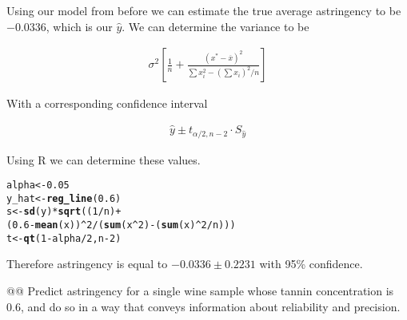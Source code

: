 \documentclass[10pt]{article}\usepackage[]{graphicx}\usepackage[]{xcolor}
\makeatletter
\newcommand{\hlnum}[1]{\textcolor[rgb]{0.686,0.059,0.569}{#1}}%
\newcommand{\hlopt}[1]{\textcolor[rgb]{0,0,0}{#1}}%
\newcommand{\hlstd}[1]{\textcolor[rgb]{0.345,0.345,0.345}{#1}}%
\newcommand{\hlkwb}[1]{\textcolor[rgb]{0.69,0.353,0.396}{#1}}%
\newcommand{\hlkwd}[1]{\textcolor[rgb]{0.737,0.353,0.396}{\textbf{#1}}}%
\newenvironment{kframe}{%
 \def\at@end@of@kframe{}%
 \ifinner\ifhmode%
  \def\at@end@of@kframe{\end{minipage}}%
  \begin{minipage}{\columnwidth}%
 \fi\fi%
 \def\FrameCommand##1{\hskip\@totalleftmargin \hskip-\fboxsep
 \colorbox{shadecolor}{##1}\hskip-\fboxsep
     \hskip-\linewidth \hskip-\@totalleftmargin \hskip\columnwidth}%
 \MakeFramed {\advance\hsize-\width
   \@totalleftmargin\z@ \linewidth\hsize
   \@setminipage}}%
 {\par\unskip\endMakeFramed%
 \at@end@of@kframe}
\newenvironment{knitrout}{}{} %
\makeatother
\begin{document}
\begin{easylist}[enumerate]
    Using our model from before we can estimate the true average astringency to be $-0.0336$, which is our
    $\hat{y}$. We can determine the variance to be

    \begin{equation}
        \begin{aligned}
            \sigma^2 \left[
                \frac{1}{n} + \frac{{\left( x^* - \overline{x} \right)}^2}
                                {\sum x_i^2 - \left( \sum x_i \right)^2 / n}
            \right]
        \end{aligned}
    \end{equation}

    With a corresponding confidence interval

    \begin{equation}
        \begin{aligned}
            \hat{y} \pm t_{\alpha / 2, n - 2} \cdot S_{\hat{y}}
        \end{aligned}
    \end{equation}

    Using R we can determine these values.

\begin{knitrout}
\color{fgcolor}\begin{kframe}
\begin{alltt}
         \hlstd{alpha} \hlkwb{<-} \hlnum{0.05}
         \hlstd{y_hat} \hlkwb{<-} \hlkwd{reg_line}\hlstd{(}\hlnum{0.6}\hlstd{)}
         \hlstd{s} \hlkwb{<-} \hlkwd{sd}\hlstd{(y)} \hlopt{*} \hlkwd{sqrt}\hlstd{((}\hlnum{1}\hlopt{/}\hlstd{n)} \hlopt{+}
                      \hlstd{(}\hlnum{0.6} \hlopt{-} \hlkwd{mean}\hlstd{(x))}\hlopt{^}\hlnum{2}\hlopt{/}\hlstd{(}\hlkwd{sum}\hlstd{(x}\hlopt{^}\hlnum{2}\hlstd{)} \hlopt{-} \hlstd{(}\hlkwd{sum}\hlstd{(x)}\hlopt{^}\hlnum{2}\hlopt{/}\hlstd{n)))}
         \hlstd{t} \hlkwb{<-} \hlkwd{qt}\hlstd{(}\hlnum{1} \hlopt{-} \hlstd{alpha} \hlopt{/} \hlnum{2}\hlstd{, n} \hlopt{-} \hlnum{2}\hlstd{)}
\end{alltt}
\end{kframe}
\end{knitrout}


    Therefore astringency is equal to $-0.0336 \pm 0.2231$ with 95\% confidence.

    @@ Predict astringency for a single wine sample whose tannin concentration is 0.6, and do so in a way that conveys
    information about reliability and precision.\newline


\end{easylist}
\end{document}
